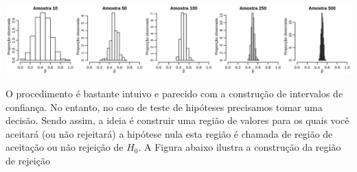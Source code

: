 \documentclass[10pt,a4paper]{book}
\begin{document}
\begin{center}\includegraphics[width=0.99\linewidth]{figures/unnamed-chunk-388-1} \end{center}

O procedimento é bastante intuivo e parecido com a construção de
intervalos de confiança. No entanto, no caso de teste de hipóteses
precisamos tomar uma decisão. Sendo assim, a ideia é construir uma
região de valores para os quais você aceitará (ou não rejeitará) a
hipótese nula esta região é chamada de região de aceitação ou não
rejeição de \(H_0\). A Figura abaixo ilustra a construção da região de
rejeição
\end{document}
